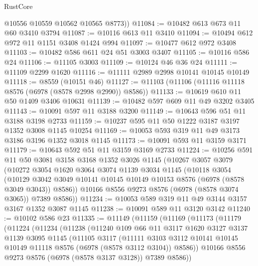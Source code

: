 \begin{lexlean}{RustCore}
\begin{coremodule}
        @10556
        @10559
        @10562
        @10565
        @8773))
@11084 := @10482 @613 @673 @11 @60 @3410 @3794
@11087 := @10116 @613 @11 @3410
@11094 := @10494 @612 @972 @11 @1151 @3408 @1424 @994
@11097 := @10477 @612 @972 @3408
@11103 := @10482 @586 @611 @24 @51 @3003 @3407
@11105 := @10116 @586 @24
@11106 := @11105 @3003
@11109 := @10124 @46 @36 @24
@11111 := @11109 @2299 @1620
@11116 := @11111 @2989 @2998 @10141 @10145 @10149
@11118 := @8559 (@10151 @46)
@11127 := @11103 (@11106 (@11116 @11118 @8576 (@6978 (@8578 @2998 @2990)) @8586))
@11133 := @10619 @610 @11 @50 @1409 @3406 @10631
@11139 := @10482 @597 @609 @11 @49 @3202 @3405
@11143 := @10091 @597 @11 @3188 @3200
@11149 := @10643 @596 @51 @11 @3188 @3198 @2733
@11159 := @10237 @595 @11 @50 @1222 @3187 @3197 @1352 @3008 @1145 @10254
@11169 := @10053 @593 @319 @11 @49 @3173 @3186 @3196 @1352 @3018 @1145
@11173 := @10091 @593 @11 @3159 @3171
@11179 := @10643 @592 @51 @11 @3159 @3169 @2733
@11224 := @10256
    @591
    @11
    @50
    @3081
    @3158
    @3168
    @1352
    @3026
    @1145
    (@10267
      @3057
      @3079
      (@10272
        @3054
        @1620
        @3064
        @3074
        @1139
        @3034
        @1145
        (@10118
          @3054
          (@10129 @3042 @3049 @10141 @10145 @10149 @10153 @8576 (@6978 (@8578 @3049 @3043)) @8586))
        @10166
        @8556
        @9273
        @8576
        (@6978 (@8578 @3074 @3065))
        @7389
        @8586))
@11234 := @10053 @589 @319 @11 @49 @3144 @3157 @3167 @1352 @3087 @1145
@11238 := @10091 @589 @11 @3120 @3142
@11240 := @10102 @586 @23
@11335 := @11149
    (@11159
      (@11169
        (@11173
          (@11179
            (@11224
              (@11234
                (@11238
                  (@11240
                    @109
                    @66
                    @11
                    @3117
                    @1620
                    @3127
                    @3137
                    @1139
                    @3095
                    @1145
                    (@11105
                      @3117
                      (@11111
                        @3103
                        @3112
                        @10141
                        @10145
                        @10149
                        @11118
                        @8576
                        (@6978 (@8578 @3112 @3104))
                        @8586))
                    @10166
                    @8556
                    @9273
                    @8576
                    (@6978 (@8578 @3137 @3128))
                    @7389
                    @8586))

\end{coremodule}
\end{lexlean}
